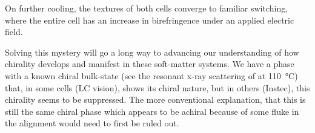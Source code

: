 \documentclass[aagreenthesis]{subfiles}
\begin{document}
On further cooling, the textures of both cells converge to familiar \smcapf{}
switching, where the entire cell has an increase in birefringence under an
applied electric field. 

Solving this mystery will go a long way to advancing our understanding of how
chirality develops and manifest in these soft-matter systems. We have a phase
with a known chiral bulk-state (see the resonant x-ray scattering of \nsix{} at
\SI{110}{\degreeCelsius}) that, in some cells (LC vision), shows its chiral nature, but in
others (Instec), this chirality seems to be suppressed. The more conventional
explanation, that this is still the same chiral \smcpalpha{} phase which appears
to be achiral because of some fluke in the alignment would need to first be
ruled out. 
\end{document}
